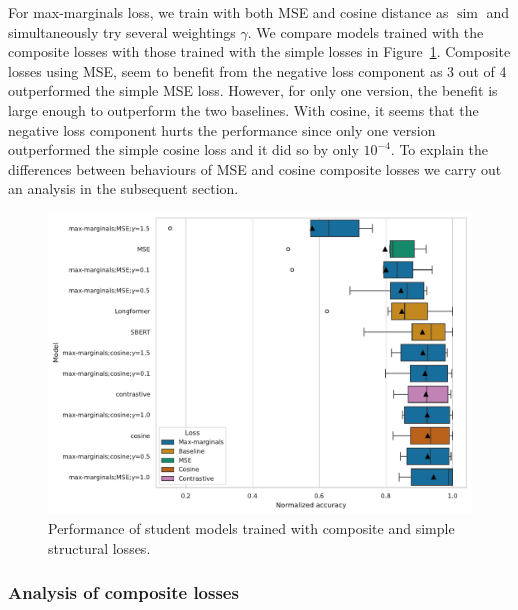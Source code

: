 For max-marginals loss, we train with both MSE and cosine distance as
$\operatorname{sim}$ and simultaneously try several weightings $\gamma$. We
compare models trained with the composite losses with those trained with the
simple losses in Figure~\ref{fig:structural_composite_vs_simple}. Composite
losses using MSE, seem to benefit from the negative loss component as 3 out of
4 outperformed the simple MSE loss. However, for only one version, the benefit
  is large enough to outperform the two baselines. With cosine, it seems that
  the negative loss component hurts the performance since only one version
  outperformed the simple cosine loss and it did so by only $10^{-4}$. To
  explain the differences between behaviours of MSE and cosine composite losses
  we carry out an analysis in the subsequent section.

\begin{figure}

  \includegraphics[width=\textwidth]{./img/structural_both_losses.pdf}

  \caption{Performance of student models trained with composite and simple
  structural losses.}

  \label{fig:structural_composite_vs_simple}
\end{figure}

\subsubsection{Analysis of composite losses}\label{section:composite_analysis}

